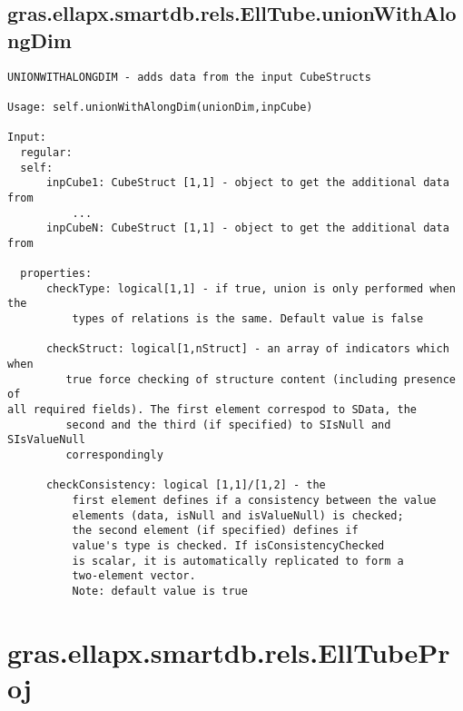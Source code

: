 \subsection{\texorpdfstring{gras.ellapx.smartdb.rels.EllTube.unionWithAlongDim}{unionWithAlongDim}}\label{method:gras.ellapx.smartdb.rels.EllTube.unionWithAlongDim}
\begin{verbatim}
UNIONWITHALONGDIM - adds data from the input CubeStructs

Usage: self.unionWithAlongDim(unionDim,inpCube)

Input:
  regular:
  self:
      inpCube1: CubeStruct [1,1] - object to get the additional data from
          ...
      inpCubeN: CubeStruct [1,1] - object to get the additional data from

  properties:
      checkType: logical[1,1] - if true, union is only performed when the
          types of relations is the same. Default value is false

      checkStruct: logical[1,nStruct] - an array of indicators which when
         true force checking of structure content (including presence of
all required fields). The first element correspod to SData, the
         second and the third (if specified) to SIsNull and SIsValueNull
         correspondingly

      checkConsistency: logical [1,1]/[1,2] - the
          first element defines if a consistency between the value
          elements (data, isNull and isValueNull) is checked;
          the second element (if specified) defines if
          value's type is checked. If isConsistencyChecked
          is scalar, it is automatically replicated to form a
          two-element vector.
          Note: default value is true
\end{verbatim}
\section{gras.ellapx.smartdb.rels.EllTubeProj}\label{secClassDescr:gras.ellapx.smartdb.rels.EllTubeProj}
